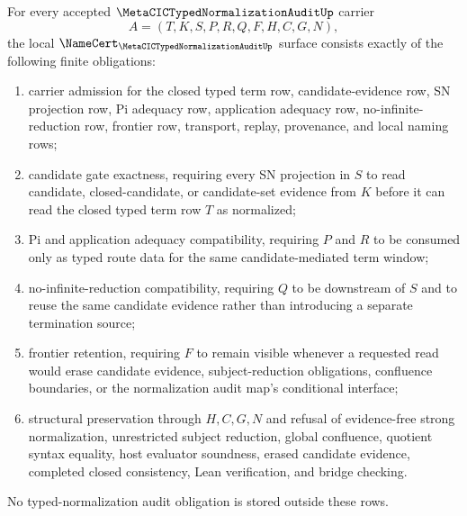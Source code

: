\begin{theorem}
\label{thm:metacic-typed-normalization-audit-namecert-obligations}
For every accepted $\MetaCICTypedNormalizationAuditUp$ carrier
$$
A=(T,K,S,P,R,Q,F,H,C,G,N),
$$
the local $\NameCert_{\MetaCICTypedNormalizationAuditUp}$ surface consists exactly of the following finite obligations:
\begin{enumerate}
\item carrier admission for the closed typed term row, candidate-evidence row, SN projection row, Pi adequacy row, application adequacy row, no-infinite-reduction row, frontier row, transport, replay, provenance, and local naming rows;
\item candidate gate exactness, requiring every SN projection in $S$ to read candidate, closed-candidate, or candidate-set evidence from $K$ before it can read the closed typed term row $T$ as normalized;
\item Pi and application adequacy compatibility, requiring $P$ and $R$ to be consumed only as typed route data for the same candidate-mediated term window;
\item no-infinite-reduction compatibility, requiring $Q$ to be downstream of $S$ and to reuse the same candidate evidence rather than introducing a separate termination source;
\item frontier retention, requiring $F$ to remain visible whenever a requested read would erase candidate evidence, subject-reduction obligations, confluence boundaries, or the normalization audit map's conditional interface;
\item structural preservation through $H,C,G,N$ and refusal of evidence-free strong normalization, unrestricted subject reduction, global confluence, quotient syntax equality, host evaluator soundness, erased candidate evidence, completed closed consistency, Lean verification, and bridge checking.
\end{enumerate}
No typed-normalization audit obligation is stored outside these rows.
\end{theorem}
